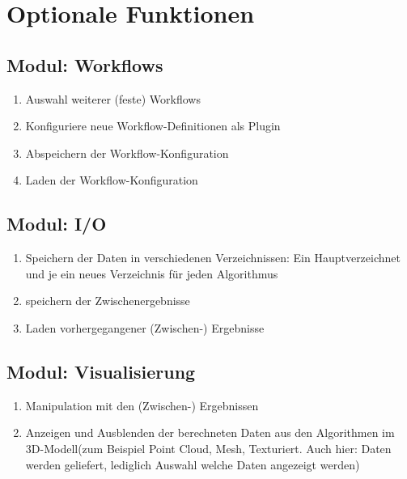 \section{Optionale Funktionen}
	\subsection{Modul: Workflows}
		\begin{enumerate}[ align=left, label={\textbf{\textbackslash FK2\arabic*0\textbackslash}} ]
			 \item Auswahl weiterer (feste) Workflows
			 \item Konfiguriere neue Workflow-Definitionen als Plugin
			 \item Abspeichern der Workflow-Konfiguration
			 \item Laden der Workflow-Konfiguration
		\end{enumerate}
		
	\subsection{Modul: I/O}
		\begin{enumerate}[ align=left, label={\textbf{\textbackslash FK2\arabic*0\textbackslash}} ]
			\item Speichern der Daten in verschiedenen Verzeichnissen: Ein Hauptverzeichnet und je ein neues Verzeichnis für jeden Algorithmus
			\item speichern der Zwischenergebnisse
			\item Laden vorhergegangener (Zwischen-) Ergebnisse
		\end{enumerate}

	\subsection{Modul: Visualisierung}
		\begin{enumerate}[ align=left, label={\textbf{\textbackslash FK1\arabic*0\textbackslash}} ]
			 \item Manipulation mit den (Zwischen-) Ergebnissen
			 \item Anzeigen und Ausblenden der berechneten Daten aus den Algorithmen im 3D-Modell(zum Beispiel Point Cloud, Mesh, Texturiert. Auch hier: Daten werden geliefert, lediglich Auswahl welche Daten angezeigt werden)
		\end{enumerate}

